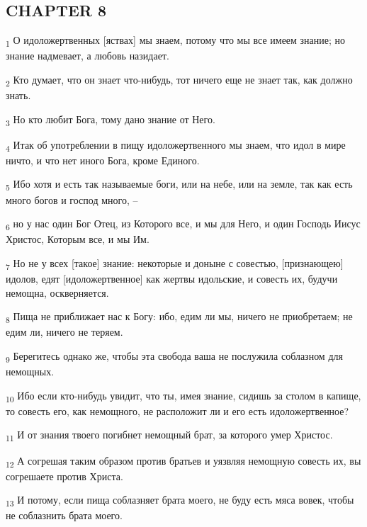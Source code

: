 \subsection{CHAPTER 8}
\begin{tcolorbox}
\textsubscript{1} О идоложертвенных [яствах] мы знаем, потому что мы все имеем знание; но знание надмевает, а любовь назидает.
\end{tcolorbox}
\begin{tcolorbox}
\textsubscript{2} Кто думает, что он знает что-нибудь, тот ничего еще не знает так, как должно знать.
\end{tcolorbox}
\begin{tcolorbox}
\textsubscript{3} Но кто любит Бога, тому дано знание от Него.
\end{tcolorbox}
\begin{tcolorbox}
\textsubscript{4} Итак об употреблении в пищу идоложертвенного мы знаем, что идол в мире ничто, и что нет иного Бога, кроме Единого.
\end{tcolorbox}
\begin{tcolorbox}
\textsubscript{5} Ибо хотя и есть так называемые боги, или на небе, или на земле, так как есть много богов и господ много, --
\end{tcolorbox}
\begin{tcolorbox}
\textsubscript{6} но у нас один Бог Отец, из Которого все, и мы для Него, и один Господь Иисус Христос, Которым все, и мы Им.
\end{tcolorbox}
\begin{tcolorbox}
\textsubscript{7} Но не у всех [такое] знание: некоторые и доныне с совестью, [признающею] идолов, едят [идоложертвенное] как жертвы идольские, и совесть их, будучи немощна, оскверняется.
\end{tcolorbox}
\begin{tcolorbox}
\textsubscript{8} Пища не приближает нас к Богу: ибо, едим ли мы, ничего не приобретаем; не едим ли, ничего не теряем.
\end{tcolorbox}
\begin{tcolorbox}
\textsubscript{9} Берегитесь однако же, чтобы эта свобода ваша не послужила соблазном для немощных.
\end{tcolorbox}
\begin{tcolorbox}
\textsubscript{10} Ибо если кто-нибудь увидит, что ты, имея знание, сидишь за столом в капище, то совесть его, как немощного, не расположит ли и его есть идоложертвенное?
\end{tcolorbox}
\begin{tcolorbox}
\textsubscript{11} И от знания твоего погибнет немощный брат, за которого умер Христос.
\end{tcolorbox}
\begin{tcolorbox}
\textsubscript{12} А согрешая таким образом против братьев и уязвляя немощную совесть их, вы согрешаете против Христа.
\end{tcolorbox}
\begin{tcolorbox}
\textsubscript{13} И потому, если пища соблазняет брата моего, не буду есть мяса вовек, чтобы не соблазнить брата моего.
\end{tcolorbox}
